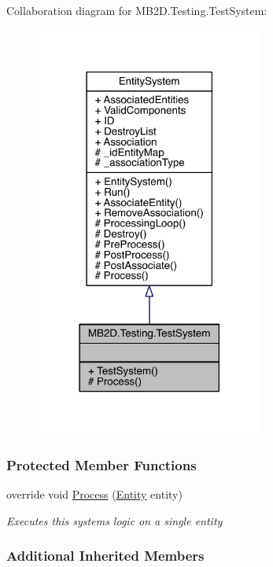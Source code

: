 Collaboration diagram for M\+B2\+D.\+Testing.\+Test\+System\+:
\nopagebreak
\begin{figure}[H]
\begin{center}
\leavevmode
\includegraphics[width=213pt]{class_m_b2_d_1_1_testing_1_1_test_system__coll__graph}
\end{center}
\end{figure}
\subsubsection*{Protected Member Functions}
\begin{DoxyCompactItemize}
\item 
override void \hyperlink{class_m_b2_d_1_1_testing_1_1_test_system_a35d160e6e7e8ffb8f1a6cf403b00ef40}{Process} (\hyperlink{class_m_b2_d_1_1_entity_component_1_1_entity}{Entity} entity)
\begin{DoxyCompactList}\small\item\em Executes this systems logic on a single entity \end{DoxyCompactList}\end{DoxyCompactItemize}
\subsubsection*{Additional Inherited Members}


